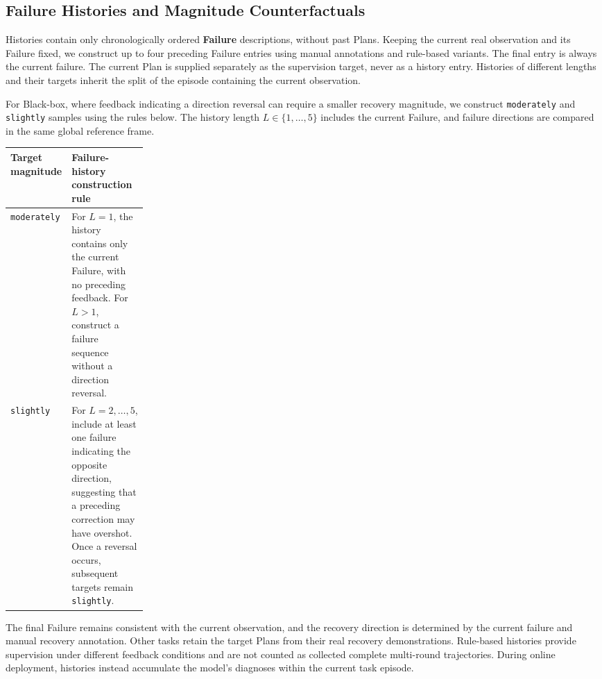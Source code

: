 \subsection{Failure Histories and Magnitude Counterfactuals}
\label{sec:app_history_counterfactual}

Histories contain only chronologically ordered \textbf{Failure} descriptions, without past Plans. Keeping the current real observation and its Failure fixed, we construct up to four preceding Failure entries using manual annotations and rule-based variants. The final entry is always the current failure. The current Plan is supplied separately as the supervision target, never as a history entry. Histories of different lengths and their targets inherit the split of the episode containing the current observation.

For Black-box, where feedback indicating a direction reversal can require a smaller recovery magnitude, we construct \texttt{moderately} and \texttt{slightly} samples using the rules below. The history length $L\in\{1,\ldots,5\}$ includes the current Failure, and failure directions are compared in the same global reference frame.

\begin{center}
\small
\setlength{\tabcolsep}{4pt}
\renewcommand{\arraystretch}{1.15}
\begin{tabularx}{\linewidth}{@{}p{0.23\linewidth}>{\raggedright\arraybackslash}X@{}}
\toprule
\textbf{Target magnitude} & \textbf{Failure-history construction rule} \\
\midrule
\texttt{moderately} & For $L=1$, the history contains only the current Failure, with no preceding feedback. For $L>1$, construct a failure sequence without a direction reversal. \\
\texttt{slightly} & For $L=2,\ldots,5$, include at least one failure indicating the opposite direction, suggesting that a preceding correction may have overshot. Once a reversal occurs, subsequent targets remain \texttt{slightly}. \\
\bottomrule
\end{tabularx}
\end{center}

The final Failure remains consistent with the current observation, and the recovery direction is determined by the current failure and manual recovery annotation. Other tasks retain the target Plans from their real recovery demonstrations. Rule-based histories provide supervision under different feedback conditions and are not counted as collected complete multi-round trajectories. During online deployment, histories instead accumulate the model's diagnoses within the current task episode.

